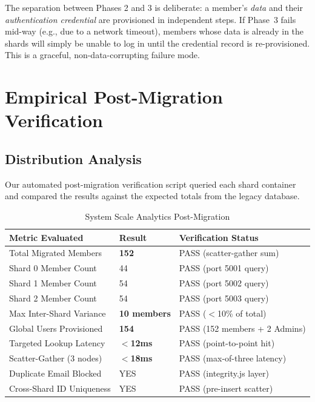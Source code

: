 \documentclass[sigconf]{acmart}
\newcommand{\theadbf}[1]{\textbf{#1}}
\begin{document}
\noindent The separation between Phases 2 and 3 is deliberate: a member's \textit{data} and their \textit{authentication credential} are provisioned in independent steps. If Phase~3 fails mid-way (e.g., due to a network timeout), members whose data is already in the shards will simply be unable to log in until the credential record is re-provisioned. This is a graceful, non-data-corrupting failure mode.

\section{Empirical Post-Migration Verification}

\subsection{Distribution Analysis}

Our automated post-migration verification script queried each shard container and compared the results against the expected totals from the legacy database.

\begin{table}[H]
\centering
\caption{System Scale Analytics Post-Migration}
\label{tab:migration-results}
\small
\renewcommand{\arraystretch}{1.3}
\begin{tabular}{|L{3cm}|L{1.2cm}|L{2.8cm}|}
\hline
{}\color{white}\theadbf{Metric Evaluated} & \color{white}\theadbf{Result} & \color{white}\theadbf{Verification Status} \\
\hline
{}Total Migrated Members & \textbf{152} & PASS (scatter-gather sum) \\
\hline
Shard 0 Member Count & 44 & PASS (port 5001 query) \\
\hline
{}Shard 1 Member Count & 54 & PASS (port 5002 query) \\
\hline
Shard 2 Member Count & 54 & PASS (port 5003 query) \\
\hline
{}Max Inter-Shard Variance & \textbf{10 members} & PASS ($<$10\% of total) \\
\hline
Global Users Provisioned & \textbf{154} & PASS (152 members + 2 Admins) \\
\hline
{}Targeted Lookup Latency & \textbf{$<$12ms} & PASS (point-to-point hit) \\
\hline
Scatter-Gather (3 nodes) & \textbf{$<$18ms} & PASS (max-of-three latency) \\
\hline
{}Duplicate Email Blocked & YES & PASS (integrity.js layer) \\
\hline
Cross-Shard ID Uniqueness & YES & PASS (pre-insert scatter) \\
\hline
\end{tabular}
\end{table}
\end{document}
